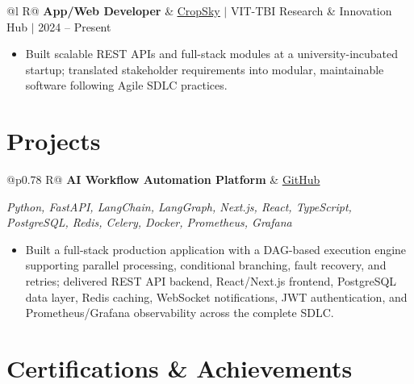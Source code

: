 \documentclass[a4paper,10pt]{article}
\newcommand{\ulink}[2]{\href{#1}{\uline{#2}}}
\newcommand{\subheading}[1]{{\color[HTML]{0A0A0A}\fontsize{12}{14}\selectfont\bfseries #1}}
\newcommand{\techstack}[1]{{\color[HTML]{5C5C5C}\fontsize{10.5}{12.5}\selectfont\itshape #1}}
\newcommand{\meta}[1]{{\color[HTML]{5C5C5C}\fontsize{10.5}{12.5}\selectfont #1}}
\begin{document}
\vspace{2pt}

\begin{tabularx}{\linewidth}{@{}l R@{}}
\subheading{App/Web Developer} & \meta{\ulink{https://sites.google.com/view/cropsky/home}{CropSky} $|$ VIT-TBI Research \& Innovation Hub $|$ 2024 -- Present}
\end{tabularx}
\begin{itemize}[nosep, leftmargin=1.5em, itemsep=1pt, topsep=2pt]
  \item {\color[HTML]{0A0A0A}\fontsize{11}{14}\selectfont Built scalable REST APIs and full-stack modules at a university-incubated startup; translated stakeholder requirements into modular, maintainable software following Agile SDLC practices.}
\end{itemize}

\vspace{2pt}

\section{Projects}
\vspace{2pt}

\begin{tabularx}{\linewidth}{@{}p{0.78\linewidth} R@{}}
\subheading{AI Workflow Automation Platform} & \meta{\ulink{https://github.com/su-jin1425/AI-Workflow-Automation-Platform}{GitHub}}
\end{tabularx}
\vspace{1pt}
\techstack{Python, FastAPI, LangChain, LangGraph, Next.js, React, TypeScript, PostgreSQL, Redis, Celery, Docker, Prometheus, Grafana}
\begin{itemize}[nosep, leftmargin=1.5em, itemsep=1pt, topsep=2pt]
  \item {\color[HTML]{0A0A0A}\fontsize{11}{14}\selectfont Built a full-stack production application with a DAG-based execution engine supporting parallel processing, conditional branching, fault recovery, and retries; delivered REST API backend, React/Next.js frontend, PostgreSQL data layer, Redis caching, WebSocket notifications, JWT authentication, and Prometheus/Grafana observability across the complete SDLC.}
\end{itemize}

\vspace{2pt}

\section{Certifications \& Achievements}
\vspace{2pt}
\end{document}
